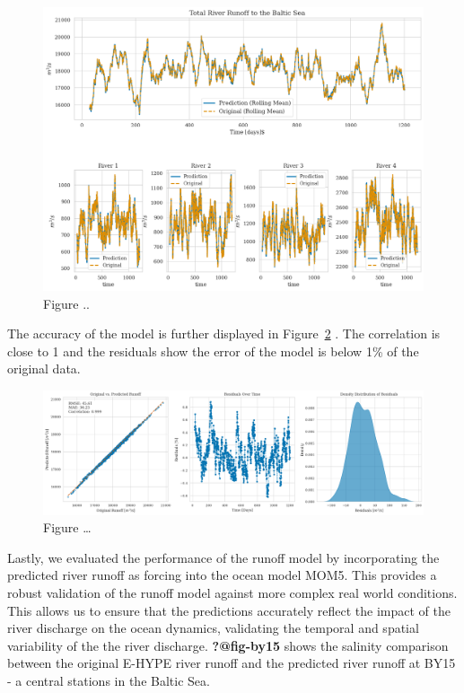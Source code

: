 \documentclass[
]{agujournal2019}
\begin{document}
\begin{figure}

{\centering \includegraphics{images/paste-1.png}

}

\caption{\label{fig-PerformanceNeuralNetworkRunoff}Figure ..}

\end{figure}

The accuracy of the model is further displayed in
Figure~\ref{fig-statistical-evaluationNN} . The correlation is close to
1 and the residuals show the error of the model is below 1\% of the
original data.

\begin{figure}

{\centering \includegraphics{images/paste-4.png}

}

\caption{\label{fig-statistical-evaluationNN}Figure \ldots{}}

\end{figure}

Lastly, we evaluated the performance of the runoff model by
incorporating the predicted river runoff as forcing into the ocean model
MOM5. This provides a robust validation of the runoff model against more
complex real world conditions. This allows us to ensure that the
predictions accurately reflect the impact of the river discharge on the
ocean dynamics, validating the temporal and spatial variability of the
the river discharge. \textbf{?@fig-by15} shows the salinity comparison
between the original E-HYPE river runoff and the predicted river runoff
at BY15 - a central stations in the Baltic Sea.
\end{document}
